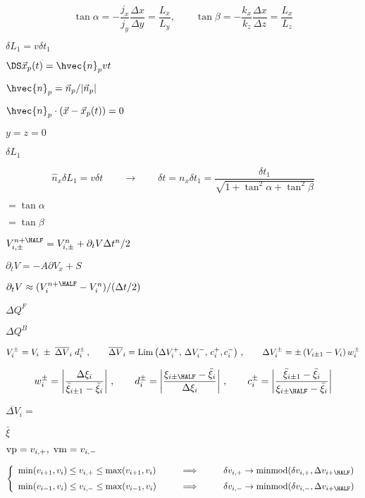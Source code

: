 \documentclass{article}
\begin{document}
\[
    \tan\alpha = -\frac{j_x}{j_y}\frac{\Delta x}{\Delta y} = \frac{L_x}{L_y} ,
    \qquad
    \tan\beta  = -\frac{k_x}{k_z}\frac{\Delta x}{\Delta z} = \frac{L_x}{L_z}
\]
\pagebreak

$\delta L_1 = v\delta t_1$
\pagebreak

$\DS \vec{x}_p(t) = \hvec{n}_p vt$
\pagebreak

$ \hvec{n}_p = \vec{n}_p/|\vec{n}_p| $
\pagebreak

$ \hvec{n}_p\cdot(\vec{x}-\vec{x}_p(t)) = 0$
\pagebreak

$ y = z = 0 $
\pagebreak

$\delta L_1$
\pagebreak

\[
    \hat{n}_x\delta L_1 = v\delta t
    \qquad\rightarrow\qquad
    \delta t = n_x\delta t_1 =
    \frac{\delta t_1}{\sqrt{1 + \tan^2\alpha + \tan^2\beta}}
\]
\pagebreak

$ = \tan\alpha$
\pagebreak

$ = \tan\beta $
\pagebreak

$ V_{i,\pm}^{n+\HALF} = V_{i,\pm}^n + \partial_t V \Delta t^n/2 $
\pagebreak

$ \partial_t V = -A\partial V_x + S $
\pagebreak

$ \partial_t V \approx (V^{n+\HALF}_i-V^n_i)/(\Delta t/2) $
\pagebreak

$\Delta Q^{F}$
\pagebreak

$\Delta Q^{B}$
\pagebreak

\[
  V_i^{\pm} = V_i \;\pm\; \overline{\Delta V}_i \; d^\pm_i\,,
  \qquad
 \overline{\Delta V}_i = {\rm Lim}\left(\Delta V_i^+,\,\Delta V_i^-,\,
                                        c^+_i, c^-_i\right)\,,
 \qquad
   \Delta V^\pm_i = \pm\left(V_{i\pm1}-V_i\right)w^\pm_i
\]
\pagebreak

\[
   w^\pm_i = \left|\frac{\Delta\xi_i}{\bar{\xi}_{i\pm1} - \bar{\xi}_i}\right| \,,
  \qquad
   d^\pm_i = \left|\frac{\xi_{i\pm\HALF} - \bar{\xi}_i}{\Delta\xi_i}\right|\,,
  \qquad
   c^\pm_i = \left|\frac{\bar{\xi}_{i\pm1} - \bar{\xi}_i}
                        {\xi_{i\pm\HALF}- \bar{\xi}_i}\right|
\]
\pagebreak

$\overline{\Delta V}_i=$
\pagebreak

$ \bar{\xi} $
\pagebreak

${\rm vp} = v_{i,+},\; {\rm vm} = v_{i,-} $
\pagebreak

\[
    \left\{\begin{array}{lll}
         \min(v_{i+1},v_i) \le v_{i,+} \le \max(v_{i+1},v_i)
         & \qquad \Longrightarrow\qquad &
         \delta v_{i,+} \to {\rm minmod}(\delta v_{i,+}, \Delta v_{i+\HALF})
     \\ \noalign{\medskip}
         \min(v_{i-1},v_i) \le v_{i,-} \le \max(v_{i-1},v_i)
         & \qquad \Longrightarrow\qquad &
         \delta v_{i,-} \to {\rm minmod}(\delta v_{i,-}, \Delta v_{i+\HALF})
     \end{array}\right.
  \]
\pagebreak
\end{document}
